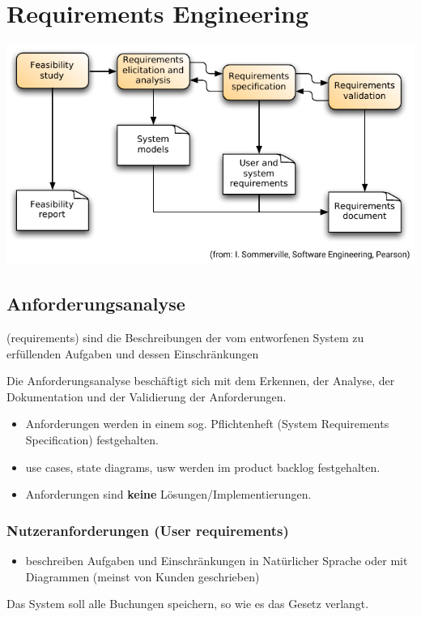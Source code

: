 \documentclass[ngerman,color=3b]{tuda_summary}
\begin{document}
\section{Requirements Engineering}
\includegraphics{bilder/Requirements engineering Process Flow.pdf}
{\centering
    \subsection{Anforderungsanalyse}
}
\begin{definition}[Anforderungen]
    (requirements) sind die Beschreibungen der vom entworfenen System zu erfüllenden Aufgaben und dessen Einschränkungen
\end{definition}
Die Anforderungsanalyse beschäftigt sich mit dem Erkennen, der Analyse, der Dokumentation und der Validierung der Anforderungen.
\begin{itemize}
    \item Anforderungen werden in einem sog. Pflichtenheft (System Requirements Specification) festgehalten.
    \item use cases, state diagrams, usw werden im product backlog festgehalten.
    \item Anforderungen sind \textbf{keine} Lösungen/Implementierungen.
\end{itemize}
\subsubsection{Nutzeranforderungen (User requirements)}
\begin{itemize}
    \item beschreiben Aufgaben und Einschränkungen in Natürlicher Sprache oder mit Diagrammen (meinst von Kunden geschrieben)
\end{itemize}
 Das System soll alle Buchungen speichern, so wie es das Gesetz verlangt.
\end{document}
